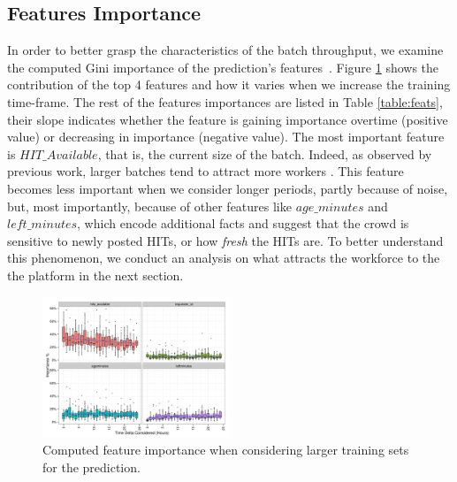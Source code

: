 \subsection{Features Importance}
In order to better grasp the characteristics of the batch throughput, we examine the computed Gini importance of the prediction's features~\cite{breiman}.
Figure \ref{fig:importances} shows the  contribution of the top 4 features and how it varies  when we increase the training time-frame. The rest of the features importances are listed in Table \ref{table:feats}, their slope indicates whether the feature is gaining importance overtime (positive value) or decreasing in importance (negative value).
The most important feature is $HIT\_Available$, that is, the current size of the batch. Indeed, as observed by previous work, larger batches tend to attract more workers \cite{mturk,crowddb}. This feature becomes less important when we consider longer periods, partly because of noise, but, most importantly, because of other features like $age\_minutes$ and $left\_minutes$, which encode additional facts and suggest that the crowd is sensitive to newly posted HITs, or how \emph{fresh} the HITs are. To better understand this phenomenon, we conduct an analysis on what attracts the workforce to the the platform in the next section.

\begin{figure}[t!]
	\centering
		\includegraphics[width=0.5\textwidth]{figures/importances}
	\caption{Computed feature importance when considering larger training sets for the prediction.}
	\label{fig:importances}
\end{figure}

